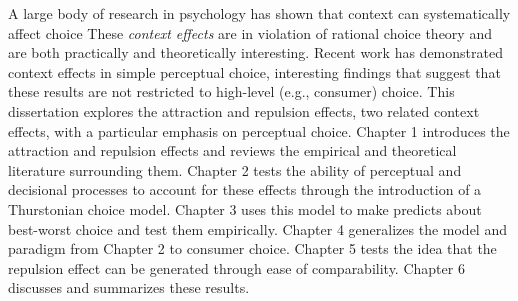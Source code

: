 A large body of research in psychology has shown that context can systematically affect choice These \textit{context effects} are in violation of rational choice theory and are both practically and theoretically interesting. Recent work has demonstrated context effects in simple perceptual choice, interesting findings that suggest that these results are not restricted to high-level (e.g., consumer) choice. This dissertation explores the attraction and repulsion effects, two related context effects, with a particular emphasis on perceptual choice. Chapter 1 introduces the attraction and repulsion effects and reviews the empirical and theoretical literature surrounding them. Chapter 2 tests the ability of perceptual and decisional processes to account for these effects through the introduction of a Thurstonian choice model. Chapter 3 uses this model to make predicts about best-worst choice and test them empirically. Chapter 4 generalizes the model and paradigm from Chapter 2 to consumer choice. Chapter 5 tests the idea that the repulsion effect can be generated through ease of comparability. Chapter 6 discusses and summarizes these results. 